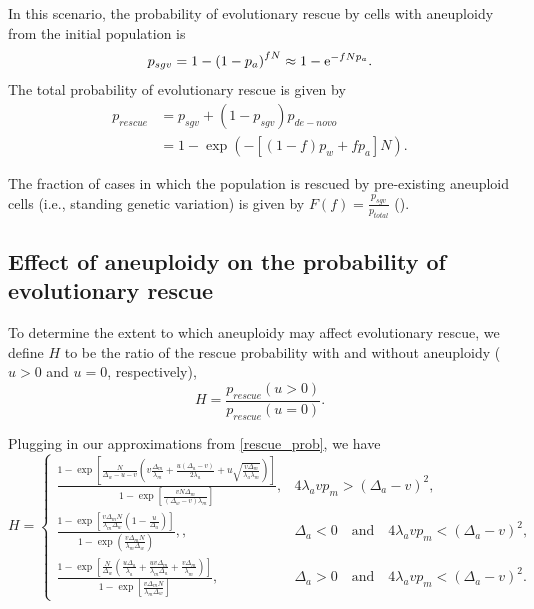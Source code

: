 \documentclass[12pt]{extarticle}
\newcommand{\e}{{\rm e}}
\begin{document}
In this scenario, the probability of evolutionary rescue by cells with aneuploidy from the initial population is
\begin{equation*}
p_{sgv} = 1-\left(1-p_a\right)^{fN}\approx 1-\e^{-fNp_a}. 
\end{equation*}
The total probability of evolutionary rescue is given by
\begin{align}\nonumber
p_{rescue} 	&= p_{sgv}+\left(1-p_{sgv}\right)p_{de-novo} \\
			&= 1-\exp\left(-\left[\left(1-f\right)p_w + fp_a\right]N\right) .
\end{align}

The fraction of cases in which the population is rescued by pre-existing aneuploid cells (i.e., standing genetic variation) is given by $F\left(f\right)=\frac{p_{sgv}}{p_{total}}$ ().


\subsection*{Effect of aneuploidy on the probability of evolutionary rescue}
To determine the extent to which aneuploidy may affect evolutionary rescue, we define $H$ to be the ratio of the rescue probability with and without aneuploidy ($u>0$ and $u=0$, respectively),
\begin{equation}\label{ratiorescueexact}
H = \frac{p_{rescue}(u>0)}{p_{rescue}(u=0)}.
\end{equation}

Plugging in our approximations from \cref{rescue_prob}, we have
\begin{equation}\label{ratiorescue}
H = \begin{cases}
\frac{1-\exp\left[\frac{N}{\Delta_w-u-v}\left(v\frac{\Delta_m}{\lambda_m}+\frac{u\left(\Delta_a-v\right)}{2\lambda_a}+u\sqrt{\frac{v\Delta_m}{\lambda_a\lambda_m}}\right)\right]}{1-\exp\left[\frac{vN\Delta_m}{\left(\Delta_w-v\right)\lambda_m}\right]} ,&
4\lambda_avp_m>\left(\Delta_a-v\right)^2 ,\\
\frac{1-\exp\left[\frac{v\Delta_mN}{\lambda_m\Delta_w}\left(1-\frac{u}{\Delta_a}\right)\right]}{1-\exp\left(\frac{v\Delta_mN}{\lambda_m\Delta_w}\right)}, ,&
\Delta_a<0\quad\text{and}\quad4\lambda_avp_m<\left(\Delta_a-v\right)^2 ,\\
\frac{1-\exp\left[\frac{N}{\Delta_w}\left(\frac{u\Delta_a}{\lambda_a}+\frac{uv\Delta_m}{\lambda_m\Delta_a}+\frac{v\Delta_m}{\lambda_m}\right)\right]}{1-\exp\left[\frac{v\Delta_mN}{\lambda_m\Delta_w}\right]} ,&
\Delta_a>0\quad\text{and}\quad4\lambda_avp_m<\left(\Delta_a-v\right)^2. %
  \end{cases}
\end{equation}
\end{document}
